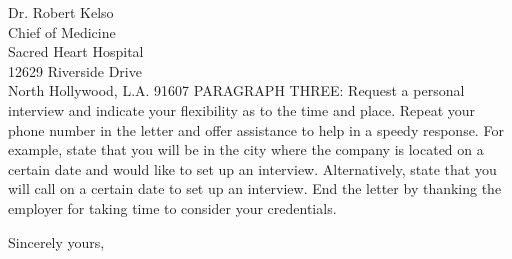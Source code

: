 \documentclass[
	parskip=half, %
	enlargefirstpage=true, %
]{scrlttr2} %
\begin{document}
\begin{letter}{
	Dr. Robert Kelso \\
	Chief of Medicine \\
	Sacred Heart Hospital \\
	12629 Riverside Drive \\
	North Hollywood, L.A. 91607
}
PARAGRAPH THREE: Request a personal interview and indicate your flexibility as to the time and place. Repeat your phone number in the letter and offer assistance to help in a speedy response. For example, state that you will be in the city where the company is located on a certain date and would like to set up an interview. Alternatively, state that you will call on a certain date to set up an interview. End the letter by thanking the employer for taking time to consider your credentials.

Sincerely yours, \\


\end{letter}
\end{document}
